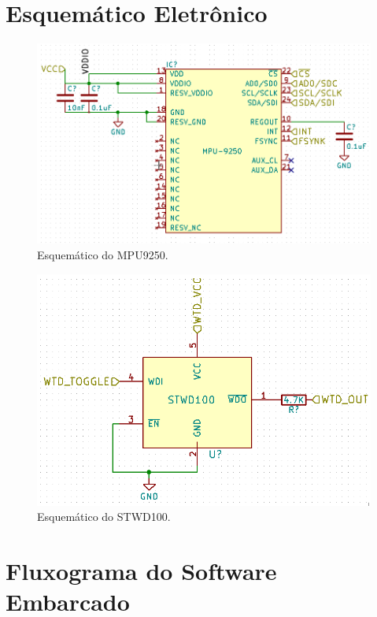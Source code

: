 \begin{apendicesenv}
\chapter{Esquemático Eletrônico}
\label{apendicee}


\begin{figure}[!h]
\centerfloat
	\centering
\includegraphics[keepaspectratio=true,scale=0.5]{figuras/mpu9250_esquema.PNG}
	\caption{Esquemático do MPU9250.}
	\label{apendMPU}
\end{figure}

\begin{figure}[!h]
\centerfloat
	\centering
\includegraphics[keepaspectratio=true,scale=0.5]{figuras/wtd_esquema.PNG}
	\caption{Esquemático do STWD100.}
	\label{STWD}
\end{figure}

\chapter{Fluxograma do Software Embarcado}
\label{apendicef}



\end{apendicesenv}
